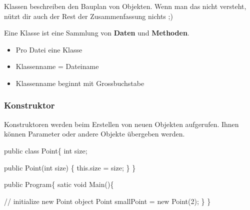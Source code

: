 \documentclass[
  letterpaper,
  DIV=11,
  numbers=noendperiod]{scrartcl}
\newenvironment{Shaded}{\begin{snugshade}}{\end{snugshade}}
\newcommand{\CommentTok}[1]{\textcolor[rgb]{0.37,0.37,0.37}{#1}}
\newcommand{\DataTypeTok}[1]{\textcolor[rgb]{0.68,0.00,0.00}{#1}}
\newcommand{\DecValTok}[1]{\textcolor[rgb]{0.68,0.00,0.00}{#1}}
\newcommand{\FunctionTok}[1]{\textcolor[rgb]{0.28,0.35,0.67}{#1}}
\newcommand{\KeywordTok}[1]{\textcolor[rgb]{0.00,0.23,0.31}{#1}}
\newcommand{\NormalTok}[1]{\textcolor[rgb]{0.00,0.23,0.31}{#1}}
\newcommand{\OperatorTok}[1]{\textcolor[rgb]{0.37,0.37,0.37}{#1}}
\providecommand{\tightlist}{%
  \setlength{\itemsep}{0pt}\setlength{\parskip}{0pt}}\usepackage{longtable,booktabs,array}
\begin{document}
\begin{multicols}{2}
Klassen beschreiben den Bauplan von Objekten. Wenn man das nicht
versteht, nützt dir auch der Rest der Zusammenfassung nichts ;)

Eine Klasse ist eine Sammlung von \textbf{Daten} und \textbf{Methoden}.

\begin{tcolorbox}[enhanced jigsaw, arc=.35mm, colbacktitle=quarto-callout-important-color!10!white, title=\textcolor{quarto-callout-important-color}{\faExclamation}\hspace{0.5em}{Important}, coltitle=black, titlerule=0mm, opacitybacktitle=0.6, left=2mm, colback=white, rightrule=.15mm, breakable, opacityback=0, leftrule=.75mm, bottomtitle=1mm, toptitle=1mm, bottomrule=.15mm, toprule=.15mm, colframe=quarto-callout-important-color-frame]

\begin{itemize}
\tightlist
\item
  Pro Datei eine Klasse
\item
  Klassenname = Dateiname
\item
  Klassenname beginnt mit Grossbuchstabe
\end{itemize}

\end{tcolorbox}

\hypertarget{konstruktor}{%
\subsubsection{Konstruktor}\label{konstruktor}}

Konstruktoren werden beim Erstellen von neuen Objekten aufgerufen. Ihnen
können Parameter oder andere Objekte übergeben werden.

\begin{Shaded}
\begin{Highlighting}[]
\KeywordTok{public} \KeywordTok{class}\NormalTok{ Point}\OperatorTok{\{}
  \DataTypeTok{int}\NormalTok{ size}\OperatorTok{;}

  \KeywordTok{public} \FunctionTok{Point}\OperatorTok{(}\DataTypeTok{int}\NormalTok{ size}\OperatorTok{)} \OperatorTok{\{}
    \KeywordTok{this}\OperatorTok{.}\FunctionTok{size} \OperatorTok{=}\NormalTok{ size}\OperatorTok{;}
  \OperatorTok{\}}
\OperatorTok{\}}

\KeywordTok{public}\NormalTok{ Program}\OperatorTok{\{}
\NormalTok{  satic }\DataTypeTok{void} \FunctionTok{Main}\OperatorTok{()\{}

    \CommentTok{// initialize new Point object}
\NormalTok{    Point smallPoint }\OperatorTok{=} \KeywordTok{new} \FunctionTok{Point}\OperatorTok{(}\DecValTok{2}\OperatorTok{);}
  \OperatorTok{\}}
\OperatorTok{\}}
\end{Highlighting}
\end{Shaded}


\end{multicols}
\end{document}
